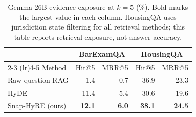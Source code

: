 \begin{table}[t]
\centering
\caption{Gemma 26B evidence exposure at $k=5$ (\%). Bold marks the largest value in each column. HousingQA uses jurisdiction state filtering for all retrieval methods; this table reports retrieval exposure, not answer accuracy.}
\label{tab:retrieval_matrix}
\footnotesize
\setlength{\tabcolsep}{6pt}
\begin{tabular}{lrrrr}
\toprule
& \multicolumn{2}{c}{BarExamQA} & \multicolumn{2}{c}{HousingQA} \\
\cmidrule(lr){2-3} \cmidrule(lr){4-5}
Method & Hit@5 & MRR@5 & Hit@5 & MRR@5 \\
\midrule
Raw question RAG & 1.4 & 0.7 & 36.9 & 23.3 \\
HyDE & 11.4 & 5.4 & 30.6 & 19.6 \\
Snap-HyRE (ours) & \textbf{12.1} & \textbf{6.0} & \textbf{38.1} & \textbf{24.5} \\
\bottomrule
\end{tabular}
\end{table}
